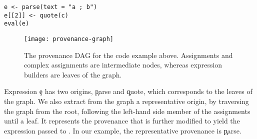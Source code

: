 \documentclass[screen,acmsmall]{acmart}%
\begin{document}
\begin{lstlisting}
e <- parse(text = "a ; b")
e[[2]] <- quote(c)
eval(e)
\end{lstlisting}

\begin{figure}[h]
\centering
\texttt{[image: provenance-graph]}
\caption{The provenance DAG for the code example above. Assignments and complex assignments are intermediate nodes, whereas expression builders are leaves of the graph.} \label{fig:provgraph}
\end{figure}



Expression \c{e} has two origins, \c{parse} and \c{quote}, which corresponds to the leaves of the graph. We also extract from the graph a representative origin, by traversing the graph from the root, following the left-hand side member of the assignments until a leaf. It represents the provenance that is further modified to yield the expression passed to \eval. In our example, the representative provenance is \c{parse}.
\end{document}
